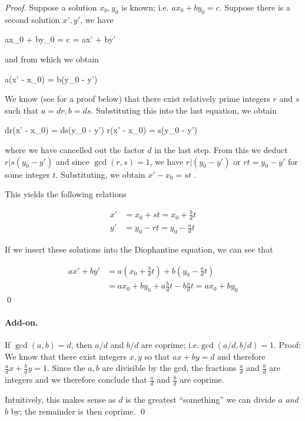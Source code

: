 \begin{proof}
  Suppose a solution $x_0, y_0$ is known; i.e. $ax_0 + by_0 = c$. Suppose there is a second solution $x', y'$, we have

  \bee
  ax_0 + by_0 = c = ax' + by'
  \eee

  and from which we obtain

  \bee
  a(x' - x_0) = b(y_0 - y')
  \eee

  We know (see for a proof below) that there exist relatively prime integers $r$ and $s$ such that $a = dr, b = ds$. Substituting this into the last equation, we obtain

  \bee
  dr(x' - x_0) = ds(y_0 - y') \rightarrow r(x' - x_0) = s(y_0 - y')
  \eee

  where we have cancelled out the factor $d$ in the last step. From this we deduct $r | s(y_0 - y')$ and since $\gcd(r,s) = 1$, we have $r | (y_0 - y')$ or $rt = y_0 - y'$ for some integer $t$. Substituting, we obtain $x' - x_0 = st$ .

  This yields the following relations

  \begin{align*}
    x' &= x_0 + st = x_0 + \frac{b}{d}t \\
    y' &= y_0 - rt = y_0 - \frac{a}{d}t
  \end{align*}

  If we insert these solutions into the Diophantine equation, we can see that

  \begin{align*}
    ax' + by' &= a \left( x_0 + \frac{b}{d}t \right) + b \left(  y_0 - \frac{a}{d}t \right) \\
              &= ax_0 + by_0 + a \frac{b}{d}t - b \frac{a}{d}t = ax_0 + by_0
  \end{align*}
  \qed
\end{proof}

\paragraph{Add-on.} If $\gcd(a,b) = d$, then $a/d$ and $b/d$ are coprime; i.e.$\gcd(a/d, b/d) = 1$. Proof: We know that there exist integers $x, y$ so that $ax + by = d$ and therefore $\frac{a}{d}x + \frac{b}{d}y = 1$. Since the $a, b$ are divisible by the gcd, the fractions $\frac{a}{d}$ and $\frac{b}{d}$ are integers and we therefore conclude that $\frac{a}{d}$ and $\frac{b}{d}$ are coprime.

Intuitively, this makes sense as $d$ is the greatest ``something'' we can divide $a$ \emph{and} $b$ by; the remainder is then coprime. \qed



